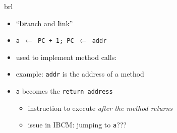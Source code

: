 \begin{frame}{brl}
    \begin{itemize}
    \item ``\textbf{br}anch and \textbf{l}ink''
    \item {\tt a $\leftarrow$ PC + 1; PC $\leftarrow$ addr} 
        \vspace{.5cm}
    \item used to implement method calls:
    \item example: {\tt addr} is the address of a method
    \item {\tt a} becomes the \texttt{return address}
        \begin{itemize}
            \item instruction to execute \textit{after the method returns}
            \item issue in IBCM: jumping to {\tt a}???
        \end{itemize}
    \end{itemize}
\end{frame}
